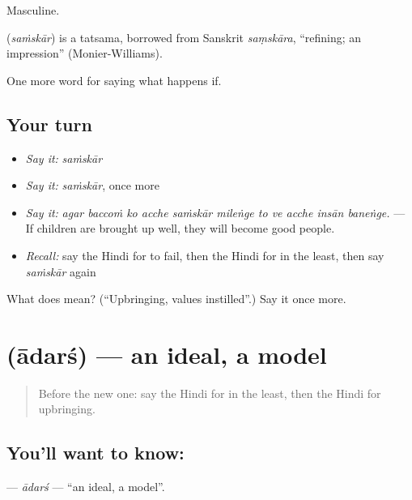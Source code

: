 Masculine.

\begin{cousinweb}
\textbf{} (\emph{saṁskār}) is a tatsama, borrowed from Sanskrit \emph{saṃskāra}, \textquotedblleft{}refining; an impression\textquotedblright{} (Monier-Williams).
\end{cousinweb}

\begin{grammarlens}[title={What you've built}]
One more word for saying what happens if.
\end{grammarlens}

\subsection*{Your turn}
\begin{itemize}
\raggedright
  \item \emph{Say it:} \emph{saṁskār}
  \item \emph{Say it:} \emph{saṁskār}, once more
  \item \emph{Say it:} \emph{agar baccoṁ ko acche saṁskār mileṅge to ve acche insān baneṅge.} — If children are brought up well, they will become good people.
  \item \emph{Recall:} say the Hindi for to fail, then the Hindi for in the least, then say \emph{saṁskār} again
\end{itemize}

\begin{tcolorbox}[breakable,colback=teal!4,colframe=teal!35!black,title={Before you move on}]
What does  mean? (\textquotedblleft{}Upbringing, values instilled\textquotedblright{}.) Say it once more.
\end{tcolorbox}
\section[\texorpdfstring{\hi{आदर्श} (ādarś)}{आदर्श (ādarś)}]{ (ādarś) — an ideal, a model}

\label{lesson:HI-C396-adars}



\begin{quote}
Before the new one: say the Hindi for in the least, then the Hindi for upbringing.
\end{quote}

\subsection*{You'll want to know: }
\textbf{} — \emph{ādarś} — \textquotedblleft{}an ideal, a model\textquotedblright{}.

